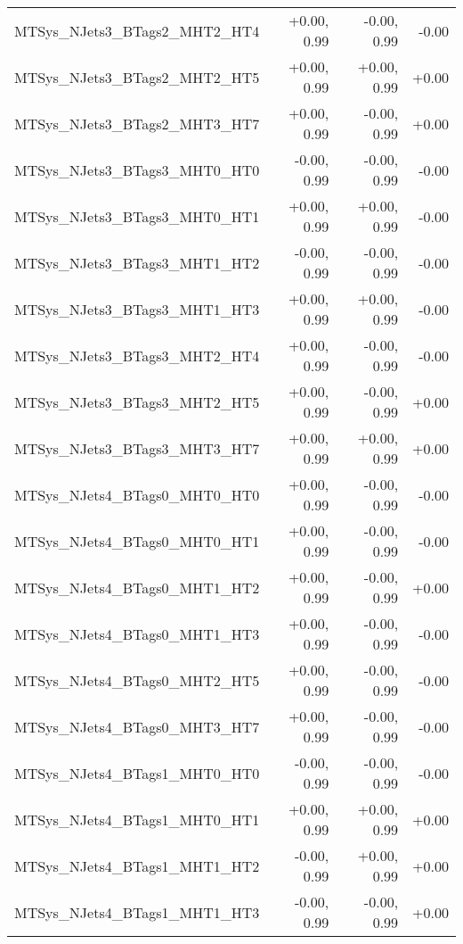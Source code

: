 \begin{tabular}{|l|r|r|r|}
MTSys\_NJets3\_BTags2\_MHT2\_HT4         &      +0.00, 0.99 &     -0.00, 0.99 &  -0.00 \\
MTSys\_NJets3\_BTags2\_MHT2\_HT5         &      +0.00, 0.99 &     +0.00, 0.99 &  +0.00 \\
MTSys\_NJets3\_BTags2\_MHT3\_HT7         &      +0.00, 0.99 &     -0.00, 0.99 &  +0.00 \\
MTSys\_NJets3\_BTags3\_MHT0\_HT0         &      -0.00, 0.99 &     -0.00, 0.99 &  -0.00 \\
MTSys\_NJets3\_BTags3\_MHT0\_HT1         &      +0.00, 0.99 &     +0.00, 0.99 &  -0.00 \\
MTSys\_NJets3\_BTags3\_MHT1\_HT2         &      -0.00, 0.99 &     -0.00, 0.99 &  -0.00 \\
MTSys\_NJets3\_BTags3\_MHT1\_HT3         &      +0.00, 0.99 &     +0.00, 0.99 &  -0.00 \\
MTSys\_NJets3\_BTags3\_MHT2\_HT4         &      +0.00, 0.99 &     -0.00, 0.99 &  -0.00 \\
MTSys\_NJets3\_BTags3\_MHT2\_HT5         &      +0.00, 0.99 &     -0.00, 0.99 &  +0.00 \\
MTSys\_NJets3\_BTags3\_MHT3\_HT7         &      +0.00, 0.99 &     +0.00, 0.99 &  +0.00 \\
MTSys\_NJets4\_BTags0\_MHT0\_HT0         &      +0.00, 0.99 &     -0.00, 0.99 &  -0.00 \\
MTSys\_NJets4\_BTags0\_MHT0\_HT1         &      +0.00, 0.99 &     -0.00, 0.99 &  -0.00 \\
MTSys\_NJets4\_BTags0\_MHT1\_HT2         &      +0.00, 0.99 &     -0.00, 0.99 &  +0.00 \\
MTSys\_NJets4\_BTags0\_MHT1\_HT3         &      +0.00, 0.99 &     -0.00, 0.99 &  -0.00 \\
MTSys\_NJets4\_BTags0\_MHT2\_HT5         &      +0.00, 0.99 &     -0.00, 0.99 &  -0.00 \\
MTSys\_NJets4\_BTags0\_MHT3\_HT7         &      +0.00, 0.99 &     -0.00, 0.99 &  -0.00 \\
MTSys\_NJets4\_BTags1\_MHT0\_HT0         &      -0.00, 0.99 &     -0.00, 0.99 &  -0.00 \\
MTSys\_NJets4\_BTags1\_MHT0\_HT1         &      +0.00, 0.99 &     +0.00, 0.99 &  +0.00 \\
MTSys\_NJets4\_BTags1\_MHT1\_HT2         &      -0.00, 0.99 &     +0.00, 0.99 &  +0.00 \\
MTSys\_NJets4\_BTags1\_MHT1\_HT3         &      -0.00, 0.99 &     -0.00, 0.99 &  +0.00 \\

\end{tabular}
